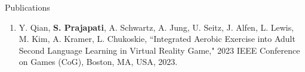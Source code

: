 \documentclass{resume}
\begin{document}
\begin{rSection}{Publications}
\begin{enumerate}[leftmargin=0.5cm]
    \item \vspace{-0.3em} Y. Qian, \textbf{S. Prajapati}, A. Schwartz, A. Jung, U. Seitz, J. Alfen, L. Lewis, M. Kim, A. Kramer, L. Chukoskie, ``Integrated Aerobic Exercise into Adult Second Language Learning in Virtual Reality Game," 2023 IEEE Conference on Games (CoG), Boston, MA, USA, 2023.
\end{enumerate}

\end{rSection}
\end{document}
